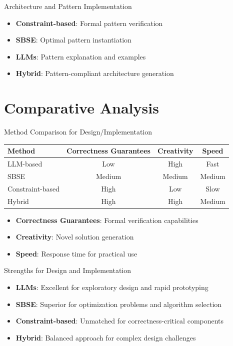 \documentclass{beamer}
\begin{document}
\begin{frame}[t]{Architecture and Pattern Implementation}
\begin{itemize}
\item \textbf{Constraint-based}: Formal pattern verification
\item \textbf{SBSE}: Optimal pattern instantiation
\item \textbf{LLMs}: Pattern explanation and examples
\item \textbf{Hybrid}: Pattern-compliant architecture generation
\end{itemize}
\end{frame}

\section{Comparative Analysis}
\begin{frame}[t]{Method Comparison for Design/Implementation}
\begin{center}
\begin{tabular}{lccc}
\textbf{Method} & \textbf{Correctness Guarantees} & \textbf{Creativity} & \textbf{Speed} \\
\hline
LLM-based & Low & High & Fast \\
SBSE & Medium & Medium & Medium \\
Constraint-based & High & Low & Slow \\
Hybrid & High & High & Medium \\
\end{tabular}
\end{center}

\begin{itemize}
\item \textbf{Correctness Guarantees}: Formal verification capabilities
\item \textbf{Creativity}: Novel solution generation
\item \textbf{Speed}: Response time for practical use
\end{itemize}
\end{frame}

\begin{frame}[t]{Strengths for Design and Implementation}
\begin{itemize}
\item \textbf{LLMs}: Excellent for exploratory design and rapid prototyping
\item \textbf{SBSE}: Superior for optimization problems and algorithm selection
\item \textbf{Constraint-based}: Unmatched for correctness-critical components
\item \textbf{Hybrid}: Balanced approach for complex design challenges
\end{itemize}
\end{frame}
\end{document}

